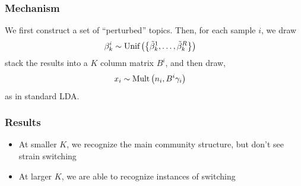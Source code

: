 \documentclass{beamer}
\begin{document}
\begin{frame}
\frametitle{Mechanism}
We first construct a set of ``perturbed'' topics. Then, for each sample $i$, we draw
\begin{align*}
\beta_{k}^{i} &\sim \textnormal{Unif}\left(\left\{\tilde{\beta}_{k}^{1}, \dots, \tilde{\beta}_{k}^{R}\right\}\right)
\end{align*}
stack the results into a $K$ column matrix $B^{i}$, and then draw,
\begin{align}
x_{i} &\sim \text{Mult}\left(n_{i}, B^{i}\gamma_{i}\right)
\end{align}
as in standard LDA.
\end{frame}

\begin{frame}
  \frametitle{Results}
  \begin{itemize}
    \item At smaller $K$, we recognize the main community structure, but don't see strain switching
    \item At larger $K$, we are able to recognize instances of switching
  \end{itemize}

\begin{figure}
\end{figure}

\end{frame}
\end{document}
